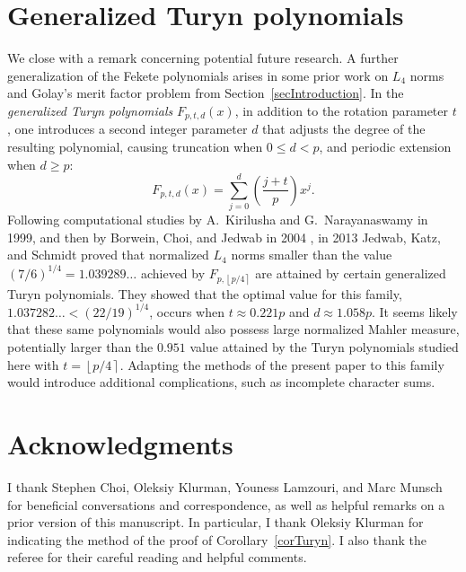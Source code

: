 \documentclass[reqno]{amsart}
\numberwithin{equation}{section}
\numberwithin{table}{section}
\numberwithin{figure}{section}
\newcommand{\leg}[2]{\left(\frac{#1}{#2}\right)}
\newcommand{\round}[1]{\left\lfloor#1\right\rceil}
\begin{document}
  
\section{Generalized Turyn polynomials}\label{secFuture}

We close with a remark concerning potential future research.
A further generalization of the Fekete polynomials arises in some prior work on $L_4$ norms and Golay's merit factor problem from Section~\ref{secIntroduction}.
In the \textit{generalized Turyn polynomials} $F_{p,t,d}(x)$, in addition to the rotation parameter $t$, one introduces a second integer parameter $d$ that adjusts the degree of the resulting polynomial, causing truncation when $0\leq d<p$, and periodic extension when $d\geq p$:
\[
F_{p,t,d}(x) = \sum_{j=0}^{d} \leg{j + t}{p} x^j.
\]
Following computational studies by A.~Kirilusha and G.~Narayanaswamy in 1999, and then by Borwein, Choi, and Jedwab in 2004 \cite{BCJ04}, in 2013 Jedwab, Katz, and Schmidt \cite{JKS13} proved that normalized $L_4$ norms smaller than the value $(7/6)^{1/4}=1.039289\ldots$ achieved by $F_{p,\round{p/4}}$ are attained by certain generalized Turyn polynomials.
They showed that the optimal value for this family, $1.037282\ldots<(22/19)^{1/4}$, occurs when $t\approx0.221p$ and $d\approx 1.058p$.
It seems likely that these same polynomials would also possess large normalized Mahler measure, potentially larger than the $0.951$ value attained by the Turyn polynomials studied here with $t=\round{p/4}$.
Adapting the methods of the present paper to this family would introduce additional complications, such as incomplete character sums.


\section*{Acknowledgments}

I thank Stephen Choi, Oleksiy Klurman, Youness Lamzouri, and Marc Munsch for beneficial conversations and correspondence, as well as helpful remarks on a prior version of this manuscript.
In particular, I thank Oleksiy Klurman for indicating the method of the proof of Corollary~\ref{corTuryn}.
I also thank the referee for their careful reading and helpful comments.



\end{document}
